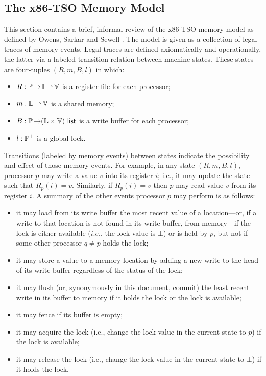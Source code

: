\documentclass[11pt]{article}
\begin{document}
\subsection{The x86-TSO Memory Model}
\label{sec:memory-model}

This section contains a brief, informal review of the x86-TSO memory model as defined by Owens, Sarkar and Sewell \cite{DBLP:conf/tphol/OwensSS09}. The model is given as a collection of legal traces of memory events. Legal traces are defined axiomatically and operationally, the latter via a labeled transition relation between machine states. These states are four-tuples $(R,m,B,l)$ in which: \begin{itemize}
	\item $R : \mathbb{P} \operatorname{\rightarrow} \mathbb{I} \operatorname{\rightharpoonup} \mathbb{V}$ is a register file for each processor;
	\item $m : \mathbb{L} \operatorname{\rightharpoonup} \mathbb{V}$ is a shared memory; 
	\item $B : \mathbb{P} \operatorname{\rightarrow} (\mathbb{L} \times \mathbb{V})~\mathsf{list}$ is a write buffer for each processor; 
	\item $l : \mathbb{P}^\bot$ is a global lock. 
\end{itemize}

Transitions (labeled by memory events) between states indicate the possibility and effect of those memory events. For example, in any state $(R,m,B,l)$, processor $p$ may write a value $v$ into its register $i$; i.e., it may update the state such that $R_p(i) = v$. Similarly, if $R_p(i) = v$ then $p$ may read value $v$ from its register $i$. A summary of the other events processor $p$ may perform is as follows: \begin{itemize}
	\item it may load from its write buffer the most recent value of a location---or, if a write to that location is not found in its write buffer, from memory---if the lock is either available ($i.e.$, the lock value is $\bot$) or is held by $p$, but not if some other processor $q \neq p$ holds the lock;
	\item it may store a value to a memory location by adding a new write to the head of its write buffer regardless of the status of the lock; 
	\item it may flush (or, synonymously in this document, commit) the least recent write in its buffer to memory if it holds the lock or the lock is available;  
	\item it may fence if its buffer is empty;
	\item it may acquire the lock (i.e., change the lock value in the current state to $p$) if the lock is available; 
	\item it may release the lock (i.e., change the lock value in the current state to $\bot$) if it holds the lock.
\end{itemize}
\end{document}
